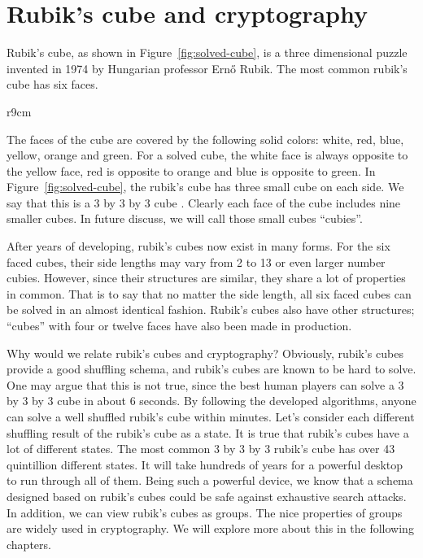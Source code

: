 \section{Rubik's cube and cryptography}
\par Rubik's cube, as shown in Figure~\ref{fig:solved-cube}, is a three dimensional puzzle invented in 1974 by Hungarian professor Ernő Rubik. The most common rubik's cube has six faces.
\begin{wrapfigure}{r}{9cm}
  \centering
  \RubikCubeSolved{}
  \caption{A rubik's cube at the solved state.}\label{fig:solved-cube}
\end{wrapfigure}
The faces of the cube are covered by the following solid colors: white, red, blue, yellow, orange and green. For a solved cube, the white face is always opposite to the yellow face, red is opposite to orange and blue is opposite to green. In Figure~\ref{fig:solved-cube}, the rubik's cube has three small cube on each side. We say that this is a 3 by 3 by 3 cube . Clearly each face of the cube includes nine smaller cubes. In future discuss, we will call those small cubes ``cubies''.
\par After years of developing, rubik's cubes now exist in many forms. For the six faced cubes, their side lengths may vary from 2 to 13 or even larger number cubies. However, since their structures are similar, they share a lot of properties in common. That is to say that no matter the side length, all six faced cubes can be solved in an almost identical fashion. Rubik's cubes also have other structures; ``cubes'' with four or twelve faces have also been made in production.
\par Why would we relate rubik's cubes and cryptography? Obviously, rubik's cubes provide a good shuffling schema, and rubik's cubes are known to be hard to solve. One may argue that this is not true, since the best human players can solve a 3 by 3 by 3 cube in about 6 seconds. By following the developed algorithms, anyone can solve a well shuffled rubik's cube within minutes. Let's consider each different shuffling result of the rubik's cube as a state. It is true that rubik's cubes have a lot of different states. The most common 3 by 3 by 3 rubik's cube has over 43 quintillion different states. It will take hundreds of years for a powerful desktop to run through all of them. Being such a powerful device, we know that a schema designed based on rubik's cubes could be safe against exhaustive search attacks. In addition, we can view rubik's cubes as groups. The nice properties of groups are widely used in cryptography. We will explore more about this in the following chapters.

